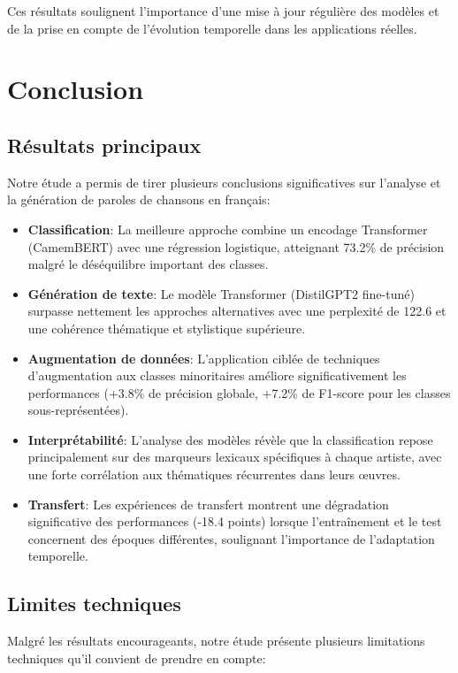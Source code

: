 \documentclass[a4paper,11pt]{article}
\begin{document}
Ces résultats soulignent l'importance d'une mise à jour régulière des modèles et de la prise en compte de l'évolution temporelle dans les applications réelles.

\section{Conclusion}
\label{sec:conclusion}

\subsection{Résultats principaux}
Notre étude a permis de tirer plusieurs conclusions significatives sur l'analyse et la génération de paroles de chansons en français:

\begin{itemize}
    \item \textbf{Classification}: La meilleure approche combine un encodage Transformer (CamemBERT) avec une régression logistique, atteignant 73.2\% de précision malgré le déséquilibre important des classes.
    
    \item \textbf{Génération de texte}: Le modèle Transformer (DistilGPT2 fine-tuné) surpasse nettement les approches alternatives avec une perplexité de 122.6 et une cohérence thématique et stylistique supérieure.
    
    \item \textbf{Augmentation de données}: L'application ciblée de techniques d'augmentation aux classes minoritaires améliore significativement les performances (+3.8\% de précision globale, +7.2\% de F1-score pour les classes sous-représentées).
    
    \item \textbf{Interprétabilité}: L'analyse des modèles révèle que la classification repose principalement sur des marqueurs lexicaux spécifiques à chaque artiste, avec une forte corrélation aux thématiques récurrentes dans leurs œuvres.
    
    \item \textbf{Transfert}: Les expériences de transfert montrent une dégradation significative des performances (-18.4 points) lorsque l'entraînement et le test concernent des époques différentes, soulignant l'importance de l'adaptation temporelle.
\end{itemize}

\subsection{Limites techniques}
Malgré les résultats encourageants, notre étude présente plusieurs limitations techniques qu'il convient de prendre en compte:
\end{document}

